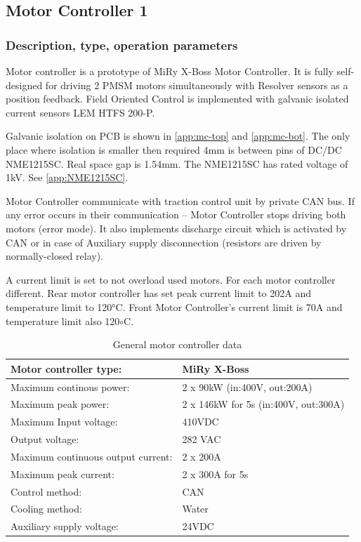 \subsection{Motor Controller 1}

\subsubsection{Description, type, operation parameters}
Motor controller is a prototype of MiRy X-Boss Motor Controller. It is fully self-designed for driving 2 PMSM motors simultaneously with Resolver sensors as a position feedback. Field Oriented Control is implemented with galvanic isolated current sensors LEM HTFS 200-P.

Galvanic isolation on PCB is shown in \ref{app:mc-top} and \ref{app:mc-bot}. The only place where isolation is smaller then required 4mm is between pins of DC/DC NME1215SC. Real space gap is 1.54mm. The NME1215SC has rated voltage of 1kV. See \ref{app:NME1215SC}.

Motor Controller communicate with traction control unit by private CAN bus. If any error occurs in their communication – Motor Controller stops driving both motors (error mode). It also implements discharge circuit which is activated by CAN or in case of Auxiliary supply disconnection (resistors are driven by normally-closed relay).

A current limit is set to not overload used motors. For each motor controller different. Rear motor controller has set peak current limit to 202A and temperature limit to 120°C. Front Motor Controller’s current limit is 70A and temperature limit also 120$\circ$C.

\begin{table}[H]
	\centering
	\caption{General motor controller data}
	\begin{tabularx}{\textwidth}{|X|X|}\hline
		Motor controller type: & MiRy X-Boss \\[\TableSize]\hline
		Maximum continous power: & 2 x 90kW (in:400V, out:200A) \\[\TableSize]\hline
		Maximum peak power: & 2 x 146kW for 5s (in:400V, out:300A) \\[\TableSize]\hline
		Maximum Input voltage: & 410VDC \\[\TableSize]\hline
		Output voltage: & 282 VAC \\[\TableSize]\hline
		Maximum continuous output current: & 2 x 200A \\[\TableSize]\hline
		Maximum peak current: & 2 x 300A for 5s \\[\TableSize]\hline
		Control method: & CAN \\[\TableSize]\hline
		Cooling method: & Water \\[\TableSize]\hline
		Auxiliary supply voltage: & 24VDC \\[\TableSize]\hline
	\end{tabularx}%
	\label{tab:MC:general}%
\end{table}%

